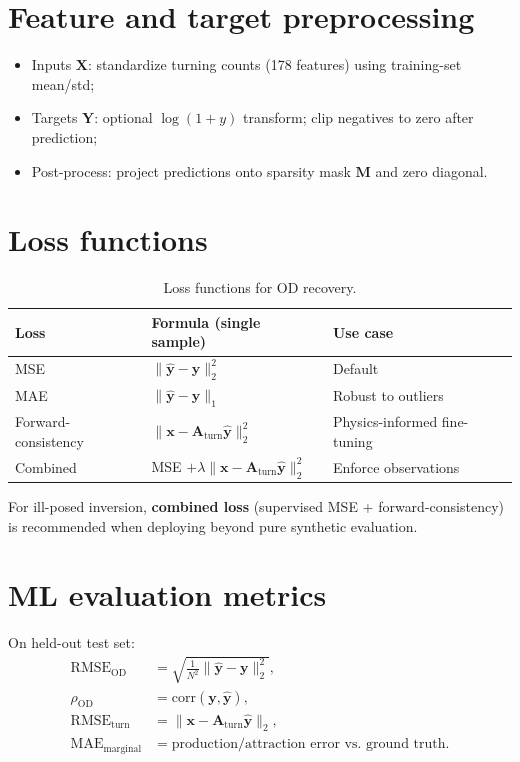 \documentclass[11pt,a4paper]{report}
\newcommand{\mathbfM}{\mathbf{M}}
\newcommand{\mathbfy}{\mathbf{y}}
\newcommand{\mathbfx}{\mathbf{x}}
\newcommand{\mathbfX}{\mathbf{X}}
\newcommand{\mathbfY}{\mathbf{Y}}
\newcommand{\Aturn}{\mathbf{A}_{\mathrm{turn}}}
\begin{document}
\section{Feature and target preprocessing}

\begin{itemize}[noitemsep]
    \item Inputs $\mathbfX$: standardize turning counts (178 features) using training-set mean/std;
    \item Targets $\mathbfY$: optional $\log(1+y)$ transform; clip negatives to zero after prediction;
    \item Post-process: project predictions onto sparsity mask $\mathbfM$ and zero diagonal.
\end{itemize}

\section{Loss functions}

\begin{table}[ht]
\centering
\caption{Loss functions for OD recovery.}
\label{tab:loss}
\begin{tabular}{@{}lll@{}}
\toprule
\textbf{Loss} & \textbf{Formula (single sample)} & \textbf{Use case} \\
\midrule
MSE & $\|\hat{\mathbfy}-\mathbfy\|_2^2$ & Default \\
MAE & $\|\hat{\mathbfy}-\mathbfy\|_1$ & Robust to outliers \\
Forward-consistency & $\|\mathbfx-\Aturn\hat{\mathbfy}\|_2^2$ & Physics-informed fine-tuning \\
Combined & MSE $+\lambda\|\mathbfx-\Aturn\hat{\mathbfy}\|_2^2$ & Enforce observations \\
\bottomrule
\end{tabular}
\end{table}

For ill-posed inversion, \textbf{combined loss} (supervised MSE + forward-consistency) is recommended when deploying beyond pure synthetic evaluation.

\section{ML evaluation metrics}

On held-out test set:
\begin{align}
    \mathrm{RMSE}_{\mathrm{OD}} &= \sqrt{\frac{1}{N^2}\|\hat{\mathbfy}-\mathbfy\|_2^2}, \\
    \rho_{\mathrm{OD}} &= \mathrm{corr}(\mathbfy,\hat{\mathbfy}), \\
    \mathrm{RMSE}_{\mathrm{turn}} &= \|\mathbfx-\Aturn\hat{\mathbfy}\|_2, \\
    \mathrm{MAE}_{\mathrm{marginal}} &= \text{production/attraction error vs.\ ground truth}.
\end{align}
\end{document}
